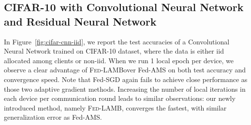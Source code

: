 \documentclass[11pt]{article}
\newcommand{\algo}{\textsc{Fed-LAMB}}
\begin{document}
%

\vspace{-0.05in}
\subsection{CIFAR-10 with Convolutional Neural Network and Residual Neural Network}
\vspace{-0.05in}

In Figure~\ref{fig:cifar-cnn-iid}, we report the test accuracies of a Convolutional Neural Network trained on CIFAR-10 dataset, where the data is either iid allocated among clients or non-iid.
When we run 1 local epoch per device, we observe a clear advantage of \algo over Fed-AMS on both test accuracy and convergence speed.
Note that Fed-SGD again fails to achieve close performance as those two adaptive gradient methods. 
Increasing the number of local iterations in each device per communication round leads to similar observations: our newly introduced method, namely \algo, converges the fastest, with similar generalization error as Fed-AMS. 
\end{document}
